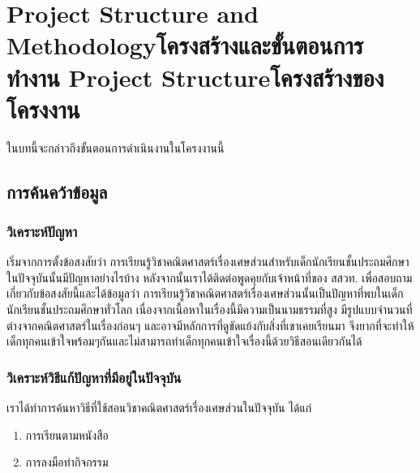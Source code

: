 \chapter{\ifproject%
\ifenglish Project Structure and Methodology\else โครงสร้างและขั้นตอนการทำงาน\fi
\else%
\ifenglish Project Structure\else โครงสร้างของโครงงาน\fi
\fi
}

ในบทนี้จะกล่าวถึงขั้นตอนการดำเนินงานในโครงงานนี้

\makeatletter


\makeatother

\section{การค้นคว้าข้อมูล}

\subsection{วิเคราะห์ปัญหา}
 เริ่มจากการตั้งข้อสงสัยว่า การเรียนรู้วิชาคณิตศาสตร์เรื่องเศษส่วนสำหรับเด็กนักเรียนชั้นประถมศึกษาในปัจจุบันนั้นมีปัญหาอย่างไรบ้าง
 หลังจากนั้นเราได้ติดต่อพูดคุยกับเจ้าหน้าที่ของ สสวท. เพื่อสอบถามเกี่ยวกับข้อสงสัยนี้และได้ข้อมูลว่า การเรียนรู้วิชาคณิตศาสตร์เรื่องเศษส่วนนั้นเป็นปัญหาที่พบในเด็กนักเรียนชั้นประถมศึกษาทั่วโลก
 เนื่องจากเนื้อหาในเรื่องนี้มีความเป็นนามธรรมที่สูง มีรูปแบบจำนวนที่ต่างจากคณิตศาสตร์ในเรื่องก่อนๆ และอาจมีหลักการที่ดูขัดแย้งกับสิ่งที่เขาเคยเรียนมา จึงยากที่จะทำให้เด็กทุกคนเข้าใจพร้อมๆกันและไม่สามารถทำเด็กทุกคนเข้าใจเรื่องนี้ด้วยวิธีสอนเดียวกันได้

\subsection{วิเคราะห์วิธีแก้ปัญหาที่มีอยู่ในปัจจุบัน}
เราได้ทำการค้นหาวิธีที่ใช้สอนวิชาคณิตศาสตร์เรื่องเศษส่วนในปัจจุบัน ได้แก่
\begin{enumerate}
    \item การเรียนตามหนังสือ
    \item การลงมือทำกิจกรรม
\end{enumerate}


